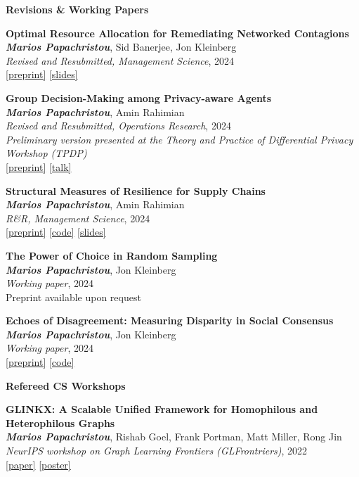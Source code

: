 \documentclass[margin]{res}
\newcommand{\field}[2]{\noindent \textbf{#1} \hfill #2 \\}
\newcommand{\specialurl}[2]{\href {#2} {{{[#1]}}}}
\newcommand{\preprint}[1]{\specialurl {preprint} {#1}}
\newcommand{\code}[1]{\specialurl {code} {#1}}
\newcommand{\talk}[1]{\specialurl {talk} {#1}}
\newcommand{\slides}[1]{\specialurl {slides} {#1}}
\newcommand{\poster}[1]{\specialurl {poster} {#1}}
\newcommand{\paper}[1]{\specialurl {paper} {#1}}
\newcommand{\authorref}[1]{{\textit{\textbf{#1}}}}
\newcommand{\authorme}{\authorref{Marios Papachristou}}
\newcommand{\publication}[5]{\textbf{#1}\\{#2}\\\emph{#3}, {#4}\\{#5}\smallskip}
\begin{document}
\begin{resume}
{\begin{enumerate}[nosep, label={[C\arabic*]}]
\end{enumerate}}


\field{Revisions \& Working Papers}{}{
\begin{enumerate}[nosep, label={[WP\arabic*]}]  

   \item \publication{Optimal Resource Allocation for Remediating Networked Contagions}{\authorme, Sid Banerjee, Jon Kleinberg}{Revised and Resubmitted, Management Science}{2024}{\preprint{https://papers.ssrn.com/sol3/papers.cfm?abstract_id=4880536} \slides{https://drive.google.com/file/d/1DgOCnJ5Pf3Je-F7a-Adiy2TTZ7oZUbbB/view?usp=sharing}} 
      \item \publication{Group Decision-Making among Privacy-aware Agents}{\authorme, Amin Rahimian}{Revised and Resubmitted, Operations Research}{2024}{
  		\emph{Preliminary version presented at the Theory and Practice of Differential Privacy Workshop (TPDP)} \\ \preprint{https://arxiv.org/pdf/2402.08156.pdf} \talk{https://www.youtube.com/watch?v=Kmm5HEMuS4w}}
   	   
   \item \publication{Structural Measures of Resilience for Supply Chains}{\authorme, Amin Rahimian}{R\&R, Management Science}{2024}{ 
   		\preprint{https://papers.ssrn.com/sol3/papers.cfm?abstract_id=4392226} \code{https://github.com/papachristoumarios/supply-chain-resilience} \slides{https://drive.google.com/file/d/13kgKnjTHyO8j4BOJVykWwt43hSt3JrLw/view?usp=drive_link}}
   		
   	\item \publication{The Power of Choice in Random Sampling}{\authorme, Jon Kleinberg}{Working paper}{2024}{Preprint available upon request}
   
   	\item \publication{Echoes of Disagreement: Measuring Disparity in Social Consensus}{\authorme, Jon Kleinberg}{Working paper}{2024}{\preprint{https://arxiv.org/abs/2504.07480} \code{https://github.com/papachristoumarios/disparity-optimization}}
    \end{enumerate}}


\field{Refereed CS Workshops}{}{
\begin{enumerate}[nosep, label={[W\arabic*]}]  
	\item \publication{GLINKX: A Scalable Unified Framework for Homophilous and Heterophilous Graphs}{\authorme, Rishab Goel, Frank Portman, Matt Miller, Rong Jin}{NeurIPS workshop on Graph Learning Frontiers (GLFrontriers)}{2022}{\paper{https://openreview.net/forum?id=GlViaJSwnlK} \poster{https://drive.google.com/file/d/14LwkvoH7sUe6qGvINGqTuMSHid16J3Av/view?usp=share_link}}
\end{enumerate}}


\end{resume}
\end{document}
